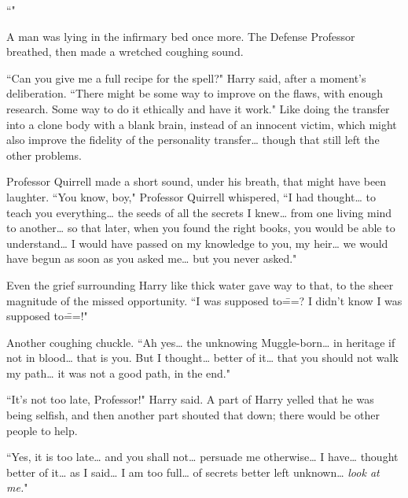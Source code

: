 ``"

A man was lying in the infirmary bed once more. The Defense Professor breathed, then made a wretched coughing sound.

``Can you give me a full recipe for the spell?" Harry said, after a moment's deliberation. ``There might be some way to improve on the flaws, with enough research. Some way to do it ethically and have it work." Like doing the transfer into a clone body with a blank brain, instead of an innocent victim, which might also improve the fidelity of the personality transfer{\ldots} though that still left the other problems.

Professor Quirrell made a short sound, under his breath, that might have been laughter. ``You know, boy," Professor Quirrell whispered, ``I had thought{\ldots} to teach you everything{\ldots} the seeds of all the secrets I knew{\ldots} from one living mind to another{\ldots} so that later, when you found the right books, you would be able to understand{\ldots} I would have passed on my knowledge to you, my heir{\ldots} we would have begun as soon as you asked me{\ldots} but you never asked."

Even the grief surrounding Harry like thick water gave way to that, to the sheer magnitude of the missed opportunity. ``I was supposed to\===? I didn't know I was supposed to\===!"

Another coughing chuckle. ``Ah yes{\ldots} the unknowing Muggle-born{\ldots} in heritage if not in blood{\ldots} that is you. But I thought{\ldots} better of it{\ldots} that you should not walk my path{\ldots} it was not a good path, in the end."

``It's not too late, Professor!" Harry said. A part of Harry yelled that he was being selfish, and then another part shouted that down; there would be other people to help.

``Yes, it is too late{\ldots} and you shall not{\ldots} persuade me otherwise{\ldots} I have{\ldots} thought better of it{\ldots} as I said{\ldots} I am too full{\ldots} of secrets better left unknown{\ldots} \emph{look at me.}"

